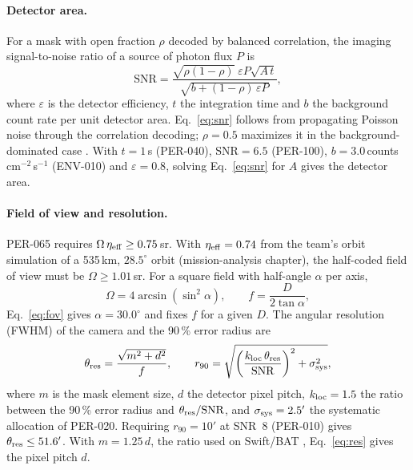 \paragraph{Detector area.} For a mask with open fraction $\rho$ decoded by balanced
correlation, the imaging signal-to-noise ratio of a source of photon flux $P$ is
\begin{equation}\label{eq:snr}
\mathrm{SNR} = \frac{\sqrt{\rho(1-\rho)}\;\varepsilon P\sqrt{A\,t}}{\sqrt{b+(1-\rho)\,\varepsilon P}},
\end{equation}
where $\varepsilon$ is the detector efficiency, $t$ the integration time and $b$ the
background count rate per unit detector area. Eq.~\eqref{eq:snr} follows from propagating
Poisson noise through the correlation decoding; $\rho=0.5$ maximizes it in the
background-dominated case \cite{Braga2019}. With $t=1$\,s (PER-040), $\mathrm{SNR}=6.5$
(PER-100), $b=3.0$\,counts\,cm$^{-2}$\,s$^{-1}$ (ENV-010) and $\varepsilon=0.8$, solving
Eq.~\eqref{eq:snr} for $A$ gives the detector area.

\paragraph{Field of view and resolution.} PER-065 requires
$\Omega\,\eta_{\rm eff}\ge0.75$\,sr. With $\eta_{\rm eff}=0.74$ from the team's orbit
simulation of a 535\,km, $28.5^\circ$ orbit (mission-analysis chapter), the half-coded field
of view must be $\Omega\ge1.01$\,sr. For a square field with half-angle $\alpha$ per axis,
\begin{equation}\label{eq:fov}
\Omega = 4\arcsin\!\left(\sin^2\alpha\right),\qquad f=\frac{D}{2\tan\alpha},
\end{equation}
Eq.~\eqref{eq:fov} gives $\alpha=30.0^\circ$ and fixes $f$ for a given $D$. The angular resolution
(FWHM) of the camera and the 90\,\% error radius are \cite{Braga2019}
\begin{equation}\label{eq:res}
\theta_{\rm res}=\frac{\sqrt{m^2+d^2}}{f},\qquad
r_{90}=\sqrt{\left(\frac{k_{\rm loc}\,\theta_{\rm res}}{\mathrm{SNR}}\right)^2+\sigma_{\rm sys}^2},
\end{equation}
where $m$ is the mask element size, $d$ the detector pixel pitch, $k_{\rm loc}=1.5$ the
ratio between the 90\,\% error radius and $\theta_{\rm res}/\mathrm{SNR}$, and
$\sigma_{\rm sys}=2.5'$ the systematic allocation of PER-020. Requiring $r_{90}=10'$ at
SNR~8 (PER-010) gives $\theta_{\rm res}\le51.6'$. With $m=1.25\,d$, the ratio used on
Swift/BAT \cite{Barthelmy2005}, Eq.~\eqref{eq:res} gives the pixel pitch $d$.

